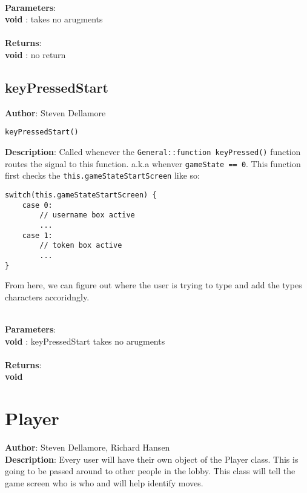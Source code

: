 \documentclass[12pt]{article}
\begin{document}
\textbf{\large{\\Parameters}}:\\
\textbf{void }: takes no arugments\\\textbf{\large{\\Returns}}:\\\textbf{void }: no return

\subsection{keyPressedStart}
\textbf{Author}: Steven Dellamore 
\vspace*{1\baselineskip}
\begin{lstlisting}
keyPressedStart()
\end{lstlisting} 
\vspace*{1\baselineskip}
\textbf{Description}: Called whenever the \texttt{General::function keyPressed()} function routes the signal to this function. a.k.a whenver \texttt{gameState == 0}. This function first checks the \texttt{this.gameStateStartScreen} like so: 
\begin{verbatim}
switch(this.gameStateStartScreen) {
    case 0:
        // username box active
        ...
    case 1:
        // token box active
        ...
}
\end{verbatim}
 From here, we can figure out where the user is trying to type and add the types characters accoridngly. 


\textbf{\large{\\Parameters}}:\\
\textbf{void }: keyPressedStart takes no arugments\\\textbf{\large{\\Returns}}:\\\textbf{void}

\section{Player}
\textbf{Author}: Steven Dellamore, Richard Hansen \\
\textbf{Description}: Every user will have their own object of the Player class. This is going to be passed around to other people in the lobby. This class will tell the game screen who is who and will help identify moves. \\
\end{document}

